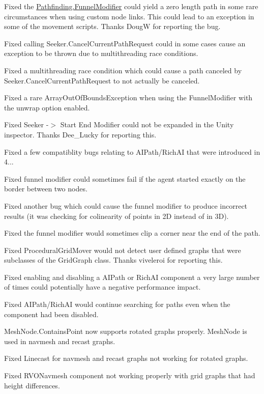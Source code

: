 \begin{DoxyItemize}
\begin{DoxyItemize}
\begin{DoxyItemize}
\item Fixed the \mbox{\hyperlink{class_pathfinding_1_1_funnel_modifier}{Pathfinding.\+Funnel\+Modifier}} could yield a zero length path in some rare circumstances when using custom node links. This could lead to an exception in some of the movement scripts. Thanks DougW for reporting the bug.
\item Fixed calling Seeker.\+Cancel\+Current\+Path\+Request could in some cases cause an exception to be thrown due to multithreading race conditions.
\item Fixed a multithreading race condition which could cause a path canceled by Seeker.\+Cancel\+Current\+Path\+Request to not actually be canceled.
\item Fixed a rare Array\+Out\+Of\+Bounds\+Exception when using the Funnel\+Modifier with the \textquotesingle{}unwrap\textquotesingle{} option enabled.
\item Fixed Seeker -\/$>$ Start End Modifier could not be expanded in the Unity inspector. Thanks Dee\+\_\+\+Lucky for reporting this.
\item Fixed a few compatiblity bugs relating to A\+I\+Path/\+Rich\+AI that were introduced in 4...
\item Fixed funnel modifier could sometimes fail if the agent started exactly on the border between two nodes.
\item Fixed another bug which could cause the funnel modifier to produce incorrect results (it was checking for colinearity of points in 2D instead of in 3D).
\item Fixed the funnel modifier would sometimes clip a corner near the end of the path.
\item Fixed Procedural\+Grid\+Mover would not detect user defined graphs that were subclasses of the Grid\+Graph class. Thanks viveleroi for reporting this.
\item Fixed enabling and disabling a A\+I\+Path or Rich\+AI component a very large number of times could potentially have a negative performance impact.
\item Fixed A\+I\+Path/\+Rich\+AI would continue searching for paths even when the component had been disabled.
\item Mesh\+Node.\+Contains\+Point now supports rotated graphs properly. Mesh\+Node is used in navmesh and recast graphs.
\item Fixed Linecast for navmesh and recast graphs not working for rotated graphs.
\item Fixed R\+V\+O\+Navmesh component not working properly with grid graphs that had height differences.

\end{DoxyItemize}
\end{DoxyItemize}
\end{DoxyItemize}
